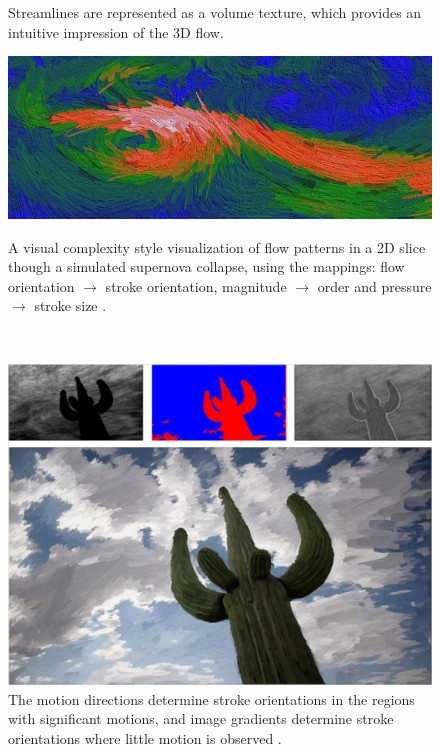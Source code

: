 \begin{figure}
\begin{minipage}{.49\textwidth}
  \caption{Streamlines are represented as a volume texture, which provides an intuitive impression of the 3D flow. \cite{liu_texture-based_2005}}
  \label{fig:liu_texture-based_2005}
\end{minipage}
\end{figure}

\begin{figure}
\centering
\begin{minipage}{.49\textwidth}
  \centering
    \includegraphics[width=1\linewidth]{images/tateosian_engaging_2007.png}
  \caption{A visual complexity style visualization of flow patterns in a 2D slice though a simulated supernova collapse, using the mappings: flow orientation $ \rightarrow $ stroke orientation, magnitude $ \rightarrow $ order and pressure $ \rightarrow $ stroke size \cite{tateosian_engaging_2007}.}
  \label{fig:tateosian_engaging_2007}
\end{minipage}~
\begin{minipage}{.49\textwidth}
  \centering
    \includegraphics[width=1\linewidth]{images/lee_motion_2009.png}
  \caption{The motion directions determine stroke orientations in the regions with significant motions, and image gradients determine stroke orientations where little motion is observed \cite{lee_motion_2009}.}
  \label{fig:lee_motion_2009}
\end{minipage}
\end{figure}

